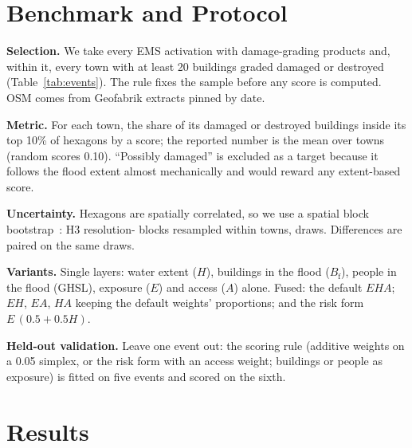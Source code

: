 \documentclass[conference]{IEEEtran}
\begin{document}
\section{Benchmark and Protocol}\label{sec:bench}

\textbf{Selection.} We take every EMS activation with damage-grading products and, within it, every town with at least 20 buildings graded damaged or destroyed (Table~\ref{tab:events}). The rule fixes the sample before any score is computed. OSM comes from Geofabrik extracts pinned by date.

\begin{table}[t]
\caption{The benchmark: every town with at least 20 damaged or destroyed buildings in six EMS grading activations.}
\label{tab:events}
\centering\footnotesize

\end{table}

\textbf{Metric.} For each town, the share of its damaged or destroyed buildings inside its top 10\% of hexagons by a score; the reported number is the mean over towns (random scores 0.10). ``Possibly damaged'' is excluded as a target because it follows the flood extent almost mechanically and would reward any extent-based score.

\textbf{Uncertainty.} Hexagons are spatially correlated, so we use a spatial block bootstrap~\cite{kunsch1989jackknife}: H3 resolution-\blockRes{} blocks resampled within towns, \nDraws{} draws. Differences are paired on the same draws.

\textbf{Variants.} Single layers: water extent ($H$), buildings in the flood ($B_\mathrm{f}$), people in the flood (GHSL), exposure ($E$) and access ($A$) alone. Fused: the default $EHA$; $EH$, $EA$, $HA$ keeping the default weights' proportions; and the risk form $E\,(0.5+0.5H)$.

\textbf{Held-out validation.} Leave one event out: the scoring rule (additive weights on a 0.05 simplex, or the risk form with an access weight; buildings or people as exposure) is fitted on five events and scored on the sixth.

\section{Results}\label{sec:results}
\end{document}
